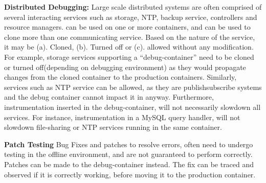 \noindent
\textbf{Distributed Debugging:}  
Large scale distributed systems are often comprised of several interacting services such as storage, NTP, backup service, controllers and resource managers.
\parikshan can be used on one or more containers, and can be used to clone more than one communicating service.
Based on the nature of the service, it may be (a). Cloned, (b). Turned off or (c). allowed without any modification.
For example, storage services supporting a ``debug-container'' need to be cloned or turned off(depending on debugging environment) as they would propagate changes from the cloned container to the production containers.
Similarly, services such as NTP service can be allowed, as they are publish\/subscribe systems and the debug container cannot impact it in anyway.
Furthermore, instrumentation inserted in the debug-container, will not necessarily slowdown all services.
For instance, instrumentation in a MySQL query handler, will not slowdown file-sharing or NTP services running in the same container.

\noindent
\textbf{Patch Testing}
Bug Fixes and patches to resolve errors, often need to undergo testing in the offline environment, and are not guaranteed to perform correctly.
Patches can be made to the debug-container instead. 
The fix can be traced and observed if it is correctly working, before moving it to the production container.